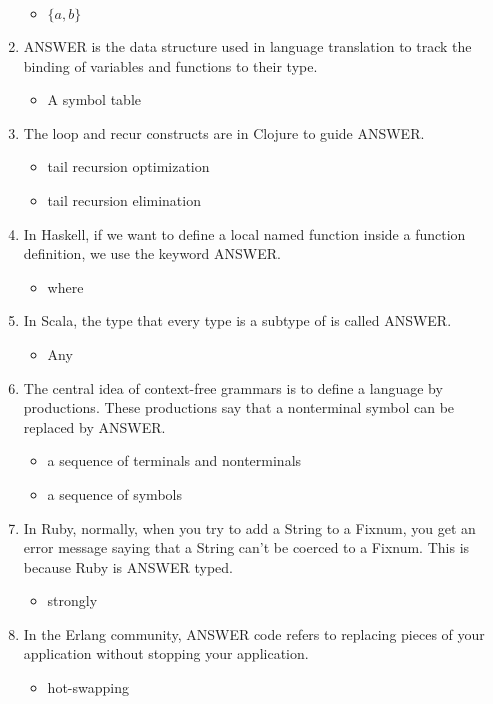 \documentclass{exam}
\begin{document}
\begin{enumerate}
\begin{itemize}
\item $\{a,b\}$
\end{itemize}
\item ANSWER is the data structure used in language translation to track the binding of variables and functions to their type.
\begin{itemize}
\item A symbol table
\end{itemize}
\item The loop and recur constructs are in Clojure to guide ANSWER.
\begin{itemize}
\item tail recursion optimization
\item tail recursion elimination
\end{itemize}
\item In Haskell, if we want to define a local named function inside a function definition, we use the keyword ANSWER.
\begin{itemize}
\item where
\end{itemize}
\item In Scala, the type that every type is a subtype of is called ANSWER.
\begin{itemize}
\item Any
\end{itemize}
\item The central idea of context-free grammars is to define a language by productions.  These productions say that a nonterminal symbol can be replaced by ANSWER.
\begin{itemize}
\item a sequence of terminals and nonterminals
\item a sequence of symbols
\end{itemize}
\item In Ruby, normally, when you try to add a String to a Fixnum, you get an error message saying that a String can't be coerced to a Fixnum.  This is because Ruby is ANSWER typed.
\begin{itemize}
\item strongly
\end{itemize}
\item In the Erlang community, ANSWER code refers to replacing pieces of your application without stopping your application.
\begin{itemize}
\item hot-swapping

\end{itemize}
\end{enumerate}
\end{document}
